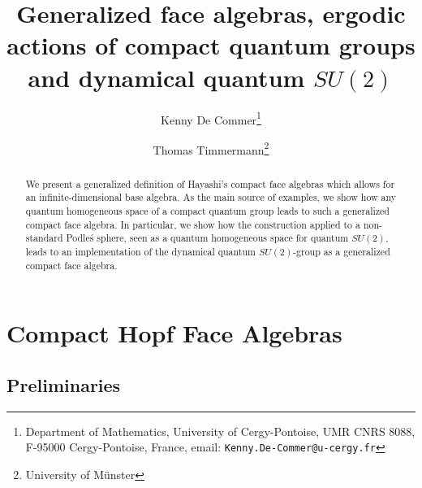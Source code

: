 \documentclass[12pt]{article}
\date{}
\theoremstyle{change}
\theoremstyle{definition}
\numberwithin{equation}{section}
\begin{document}
\title{Generalized face algebras{\scriptsize, ergodic actions of compact quantum groups and dynamical quantum $SU(2)$}}

\author{Kenny De Commer\thanks{Department of Mathematics, University of Cergy-Pontoise, UMR CNRS 8088, F-95000 Cergy-Pontoise, France, email: {\tt Kenny.De-Commer@u-cergy.fr}}
\and Thomas Timmermann\thanks{University of M\"{u}nster}}

\maketitle


\begin{abstract}
\noindent We present a generalized definition of Hayashi's compact face algebras which allows for an infinite-dimensional base algebra. {\scriptsize As the main source of examples, we show how any quantum homogeneous space of a compact quantum group leads to such a generalized compact face algebra. In particular, we show how the construction applied to a non-standard Podle\'{s} sphere, seen as a quantum homogeneous space for quantum $SU(2)$, leads to an implementation of the dynamical quantum $SU(2)$-group as a generalized compact face algebra.}
\end{abstract}









\section{Compact Hopf Face Algebras}

\subsection{Preliminaries}
\end{document}
